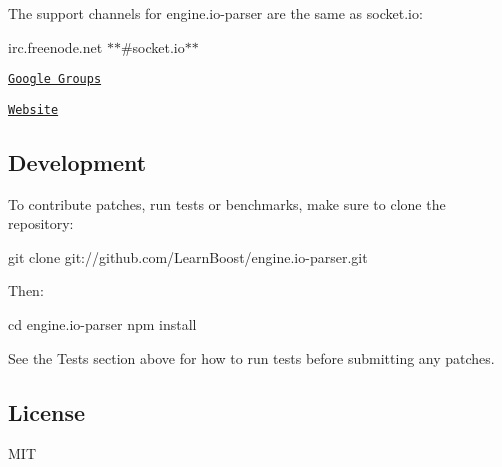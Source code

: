 The support channels for {\ttfamily engine.\+io-\/parser} are the same as {\ttfamily socket.\+io}\+:
\begin{DoxyItemize}
\item irc.\+freenode.\+net $\ast$$\ast$\#socket.\+io$\ast$$\ast$
\item \href{http://groups.google.com/group/socket_io}{\tt Google Groups}
\item \href{http://socket.io}{\tt Website}
\end{DoxyItemize}

\subsection*{Development}

To contribute patches, run tests or benchmarks, make sure to clone the repository\+:


\begin{DoxyCode}
git clone git://github.com/LearnBoost/engine.io-parser.git
\end{DoxyCode}


Then\+:


\begin{DoxyCode}
cd engine.io-parser
npm install
\end{DoxyCode}


See the {\ttfamily Tests} section above for how to run tests before submitting any patches.

\subsection*{License}

M\+IT 